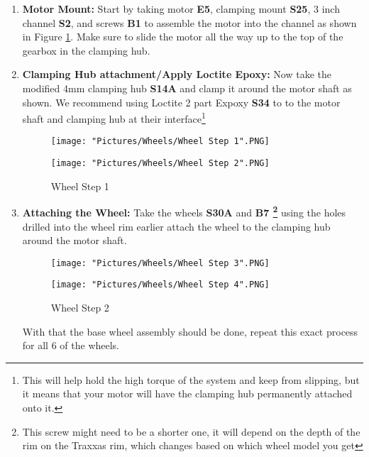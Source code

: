 \documentclass[12pt]{article}
\begin{document}
\begin{enumerate}
\item \textbf{Motor Mount:} Start by taking motor \textbf{E5}, clamping mount \textbf{S25}, 3 inch channel \textbf{S2}, and screws \textbf{B1} to assemble the motor into the channel as shown in Figure \ref {wheel step 1}. Make sure to slide the motor all the way up to the top of the gearbox in the clamping hub. 


\item \textbf{Clamping Hub attachment/Apply Loctite Epoxy:} Now take the modified 4mm clamping hub \textbf{S14A} and clamp it around the motor shaft as shown. We recommend using Loctite 2 part Expoxy \textbf{S34} to to the motor shaft and clamping hub at their interface\footnote{This will help hold the high torque of the system and keep from slipping, but it means that your motor will have the clamping hub permanently attached onto it.} 

\begin{figure}[H]
  \centering
  \begin{minipage}[b]{0.45\textwidth}
    \texttt{[image: "Pictures/Wheels/Wheel Step 1".PNG]}
  \end{minipage}
  \hfill
  \begin{minipage}[b]{0.45\textwidth}
    \texttt{[image: "Pictures/Wheels/Wheel Step 2".PNG]}
  \end{minipage}
  \caption{Wheel Step 1}
  \label{wheel step 1}
\end{figure}
\item \textbf{Attaching the Wheel:} Take the wheels \textbf{S30A} and \textbf{B7 \footnote{This screw might need to be a shorter one, it will depend on the depth of the rim on the Traxxas rim, which changes based on which wheel model you get}} using the holes drilled into the wheel rim earlier attach the wheel to the clamping hub around the motor shaft. 

\begin{figure}[H]
  \centering
  \begin{minipage}[b]{0.45\textwidth}
    \texttt{[image: "Pictures/Wheels/Wheel Step 3".PNG]}
  \end{minipage}
  \hfill
  \begin{minipage}[b]{0.45\textwidth}
    \texttt{[image: "Pictures/Wheels/Wheel Step 4".PNG]}
  \end{minipage}
  \caption{Wheel Step 2}
\end{figure}

With that the base wheel assembly should be done, repeat this exact process for all 6 of the wheels. 

\end{enumerate}
\end{document}
